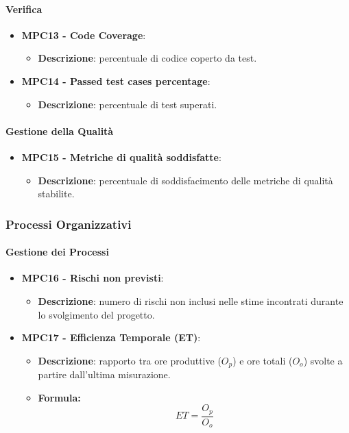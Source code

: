 \documentclass[10pt]{article}
\begin{document}
\begin{justify}
\paragraph{Verifica}
\begin{itemize}
    \item \textbf{MPC13 - Code Coverage}:
    \begin{itemize}
        \item \textbf{Descrizione}: percentuale di codice coperto da test.
    \end{itemize}
    \item \textbf{MPC14 - Passed test cases percentage}:
        \begin{itemize}
            \item \textbf{Descrizione}: percentuale di test superati.
        \end{itemize}
\end{itemize}

\paragraph{Gestione della Qualità}
\begin{itemize}
 \item \textbf{MPC15 - Metriche di qualità soddisfatte}:
    \begin{itemize}
        \item \textbf{Descrizione}: percentuale di soddisfacimento delle metriche di qualità stabilite.
    \end{itemize}
\end{itemize}

\subsubsection{Processi Organizzativi}
\paragraph{Gestione dei Processi}
\begin{itemize}
    \item \textbf{MPC16 - Rischi non previsti}:
        \begin{itemize}
            \item \textbf{Descrizione}: numero di rischi non inclusi nelle stime incontrati durante lo svolgimento del progetto.
        \end{itemize}
    \item \textbf{MPC17 - Efficienza Temporale (ET)}:
    \begin{itemize}
        \item   \textbf{Descrizione}: rapporto tra ore produttive ($O_p$) e ore totali ($O_o$) svolte a partire dall'ultima misurazione.
        \item   \textbf{Formula:}
            \[
            ET = \frac{O_p}{O_o}
            \]
    \end{itemize}
\end{itemize}

\end{justify}
\end{document}
